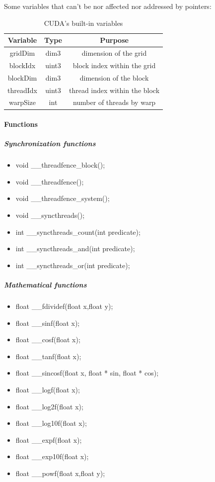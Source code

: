 Some variables that can't be nor affected nor addressed by pointers:
\begin{table}[!h]
	\caption{CUDA's built-in variables}
	\center
	\begin{tabular}{|c|c|c|} \hline
	Variable & Type & Purpose \\\hline\hline
	gridDim   & dim3  & dimension of the grid \\\hline
	blockIdx  & uint3 & block index within the grid \\\hline
	blockDim  & dim3  & dimension of the block \\\hline
	threadIdx & uint3 & thread index within the block \\\hline
	warpSize  & int   & number of threads by warp \\\hline
	\end{tabular}
	\label{heterogeneous:tabCudaVariable}
\end{table}

				\paragraph{Functions}

					\subparagraph{Synchronization functions}
					
\begin{itemize}
	\item void \_\_threadfence\_block();
	\item void \_\_threadfence();
	\item void \_\_threadfence\_system();
	\item void \_\_syncthreads();
	\item int \_\_syncthreads\_count(int predicate);
	\item int \_\_syncthreads\_and(int predicate);
	\item int \_\_syncthreads\_or(int predicate);
\end{itemize}

					\subparagraph{Mathematical functions}
					
\begin{itemize}
	\item float \_\_fdividef(float x,float y);
	\item float \_\_sinf(float x);
	\item float \_\_cosf(float x);
	\item float \_\_tanf(float x);
	\item float \_\_sincosf(float x, float * sin, float * cos);
	\item float \_\_logf(float x);
	\item float \_\_log2f(float x);
	\item float \_\_log10f(float x);
	\item float \_\_expf(float x);
	\item float \_\_exp10f(float x);
	\item float \_\_powf(float x,float y);
\end{itemize}

